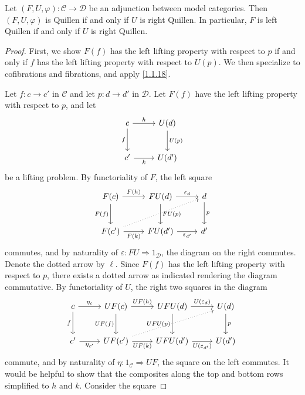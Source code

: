 \begin{lemma}\label{3.1.4}
	Let $(F,U,\varphi): \mathcal{C}  \to \mathcal{D} $ be an adjunction between model categories. Then $(F,U,\varphi)$ is Quillen if and only if $U$ is right Quillen. In particular, $F$ is left Quillen if and only if $U$ is right Quillen.
\end{lemma}
\begin{proof}
	First, we show $F(f)$ has the left lifting property with respect to $p$ if and only if $f$ has the left lifting property with respect to $U(p)$. We then specialize to cofibrations and fibrations, and apply \cref{1.1.18}.

	Let $f : c \to c'$ in $\mathcal{C} $ and let $p : d \to d'$ in $\mathcal{D} $. Let $F(f)$ have the left lifting property with respect to $p$, and let
	\[\begin{tikzcd}[row sep = 2.5em, column sep = 2.5em]
	c \ar[" f "', d] \ar[" h ", r]  & U(d)\ar[" U(p) ", d]  \\
	c' \ar[" k "', r]  & U(d')
	\end{tikzcd}\]
	be a lifting problem. By functoriality of $F$, the left square
	\[\begin{tikzcd}[row sep = 2.5em, column sep = 2.5em]
		F(c)\ar[" F(f) "', d] \ar[" F(h) ", r]  & FU(d)\ar[" FU(p) ", d]\ar[" \varepsilon_d ", r]  & d\ar[" p ", d] \\
		F(c')\ar[" F(k) "', r]  \ar[dotted, urr] & FU(d') \ar[" \varepsilon_{d'}  "', r] & d'
	\end{tikzcd}\]
	commutes, and by naturality of $\varepsilon : FU \Rightarrow 1_\mathcal{D} $, the diagram on the right commutes. Denote the dotted arrow by $\ell $. Since $F(f)$ has the left lifting property with respect to $p$, there exists a dotted arrow as indicated rendering the diagram commutative. By functoriality of $U$, the right two squares in the diagram
	\[\begin{tikzcd}[row sep = 2.5em, column sep = 2.5em]
	c \ar[" \eta_c ", r] \ar[" f "', d]  & UF(c)\ar[" UF(h) ", r] \ar[" UF(f) "', d]  & UFU(d)\ar[" U(\varepsilon_d) ", r] \ar[" UFU(p) "', d]  & U(d)\ar[" p ", d]  \\
	c'\ar[" \eta_{c'}  "', r]  & UF(c')\ar[" UF(k) "', r]\ar[dotted, urr]  & UFU(d')\ar[" U(\varepsilon_{d'})  "', r]  & U(d')
	\end{tikzcd}\]
	commute, and by naturality of $\eta : 1_{\mathcal{C} }  \Rightarrow UF$, the square on the left commutes. It would be helpful to show that the composites along the top and bottom rows simplified to $h$ and $k$. Consider the square

\end{proof}
